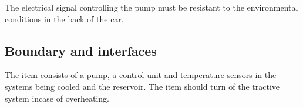 The electrical signal controlling the pump must be resistant to the
environmental conditions in the back of the car.

\subsection{Boundary and interfaces}
%
%

The item consists of a pump, a control unit and temperature sensors
in the systems being cooled and the reservoir.
The item should turn of the tractive system incase of overheating.
